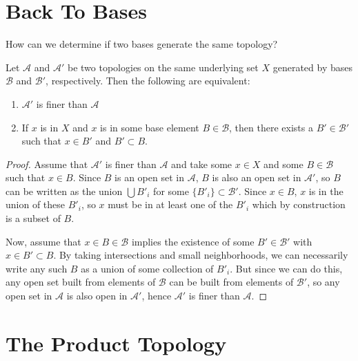 
\section*{Back To Bases}

How can we determine if two bases generate the same topology?

\begin{theorem}
	
	Let $\mathcal{A}$ and $\mathcal{A}'$ be two topologies on the same underlying set $X$ generated by bases $\mathcal{B}$ and $\mathcal{B}'$, respectively.  Then the following are equivalent:
	
	\begin{enumerate}
		\item $\mathcal{A}'$ is finer than $\mathcal{A}$
		\item If $x$ is in $X$ and $x$ is in some base element $B\in\mathcal{B}$, then there exists a $B'\in\mathcal{B}'$ such that $x\in B'$ and $B'\subset B$.
	\end{enumerate}
	
	
	
\end{theorem}

\begin{proof}
	
	Assume that $\mathcal{A}'$ is finer than $\mathcal{A}$ and take some $x\in X$ and some $B\in\mathcal{B}$ such that $x\in B$.  Since $B$ is an open set in $\mathcal{A}$, $B$ is also an open set in $\mathcal{A}'$, so $B$ can be written as the union $\bigcup B'_i$ for some $\{B'_i\}\subset \mathcal{B}'$.  Since $x\in B$, $x$ is in the union of these $B'_i$, so $x$ must be in at least one of the $B'_i$ which by construction is a subset of $B$.
	
	Now, assume that $x\in B\in\mathcal{B}$ implies the existence of some $B'\in\mathcal{B}'$ with $x\in B'\subset B$.  By taking intersections and small neighborhoods, we can necessarily write any such $B$ as a union of some collection of $B'_i$.  But since we can do this, any open set built from elements of $\mathcal{B}$ can be built from elements of $\mathcal{B}'$, so any open set in $\mathcal{A}$ is also open in $\mathcal{A}'$, hence $\mathcal{A}'$ is finer than $\mathcal{A}$.
	
	
	
\end{proof}

\section*{The Product Topology}


